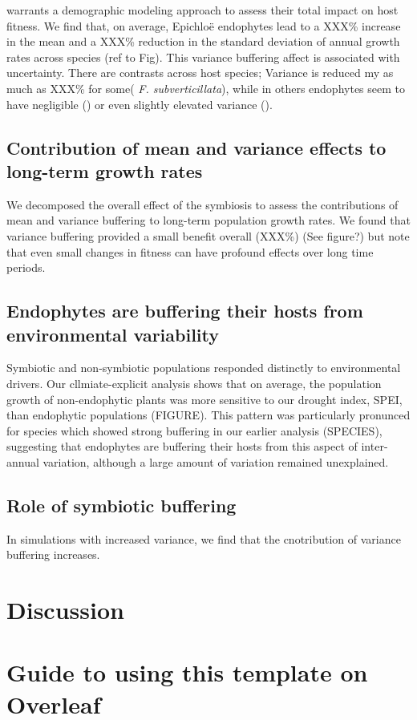 \documentclass[9pt,twocolumn,twoside,lineno]{pnas-new}
\begin{document}
warrants a demographic modeling approach to assess their total impact on host fitness. We find that, on average, Epichlo\"{e} endophytes lead to a XXX\% increase in the mean and a XXX\% reduction in the standard deviation of annual growth rates across species (ref to Fig). This variance buffering affect is associated with uncertainty. There are contrasts across host species; Variance is reduced my as much as XXX\% for some( \emph{F. subverticillata}), while in others endophytes seem to have negligible (\emph{}) or even slightly elevated variance (\emph{}).
\subsection*{Contribution of mean and variance effects to long-term growth rates}
We decomposed the overall effect of the symbiosis to assess the contributions of mean and variance buffering to long-term population growth rates. We found that variance buffering provided a small benefit overall (XXX\%) (See figure?) but note that even small changes in fitness can have profound effects over long time periods.
\subsection*{Endophytes are buffering their hosts from environmental variability}
Symbiotic and non-symbiotic populations responded distinctly to environmental drivers. Our cllmiate-explicit analysis shows that on average, the population growth of non-endophytic plants was more sensitive to our drought index, SPEI, than endophytic populations (FIGURE). This pattern was particularly pronunced for species which showed strong buffering in our earlier analysis (SPECIES), suggesting that endophytes are buffering their hosts from this aspect of inter-annual variation, although a large amount of variation remained unexplained.
\subsection*{Role of symbiotic buffering }
In simulations with increased variance, we find that the cnotribution of variance buffering increases.


\section*{Discussion}

\section*{Guide to using this template on Overleaf}
\end{document}
